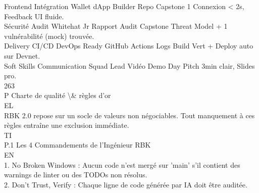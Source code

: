 \documentclass[12pt,landscape,a4paper]{article}
\begin{document}
\vspace{0.5em}
Frontend       Intégration Wallet              dApp Builder     Repo Capstone 1        Connexion \textless{} 2s, Feedback UI fluide.\\
\vspace{0.5em}
Sécurité       Audit                           Whitehat Jr      Rapport Audit Capstone Threat Model + 1 vulnérabilité (mock) trouvée.\\
\vspace{0.5em}
Delivery       CI/CD                           DevOps Ready     GitHub Actions Logs    Build Vert + Deploy auto sur Devnet.\\
\vspace{0.5em}
Soft Skills    Communication                   Squad Lead       Vidéo Demo Day         Pitch 3min clair, Slides pro.\\
\vspace{0.5em}
\vspace{0.5em}
\vspace{0.5em}
\vspace{0.5em}
263\\
P \textbar{} Charte de qualité \textbackslash{}& règles d’or\\
\vspace{0.5em}
\vspace{0.5em}
\vspace{0.5em}
\vspace{0.5em}
EL\\
RBK 2.0 repose sur un socle de valeurs non négociables. Tout manquement à ces règles entraîne une exclusion immédiate.\\
\vspace{0.5em}
\vspace{0.5em}
\vspace{0.5em}
\vspace{0.5em}
TI\\
P.1 Les 4 Commandements de l’Ingénieur RBK\\
\vspace{0.5em}
\vspace{0.5em}
\vspace{0.5em}
\vspace{0.5em}
EN\\
1. No Broken Windows : Aucun code n’est mergé sur ’main’ s’il contient des warnings de linter ou des TODOs non résolus.\\
\vspace{0.5em}
2. Don’t Trust, Verify : Chaque ligne de code générée par IA doit être auditée.\\
\end{document}
